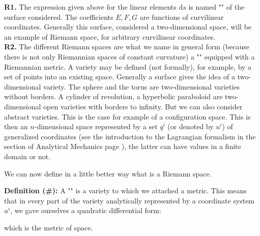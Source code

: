 	\begin{tcolorbox}[title=Remark,colframe=black,arc=10pt]
	\textbf{R1.} The expression given above for the linear elements $\mathrm{d}s$ is named "" of the surface considered. The coefficients $E, F, G$ are functions of curvilinear coordinates. Generally this surface, considered a two-dimensional space, will be an example of Riemann space, for arbitrary curvilinear coordinates.\\
	
	\textbf{R2.} The different Riemann spaces are what we name in general form (because there is not only Riemannian spaces of constant curvature) a "" equipped with a Riemannian metric. A variety may be defined (not formally), for example, by a set of points into an existing space. Generally a surface gives the idea of a two-dimensional variety. The sphere and the torus are two-dimensional varieties without borders. A cylinder of revolution, a hyperbolic paraboloid are two-dimensional open varieties with borders to infinity. But we can also consider abstract varieties. This is the case for example of a configuration space. This is then an $n$-dimensional space represented by a set $q^i$ (or denoted by $u^i$) of generalized coordinates (see the introduction to the Lagrangian formalism in the section of Analytical Mechanics page \pageref{lagrangian formalism}), the latter can have values in a finite domain or not.
	\end{tcolorbox}
	
	We can now define in a little better way what is a Riemann space.
	
	\textbf{Definition (\#\mydef):}	A "" is a variety to which we attached a metric. This means that in every part of the variety analytically represented by a coordinate system $u^i$, we gave ourselves a quadratic differential form:
	
	which is the metric of space.
	
